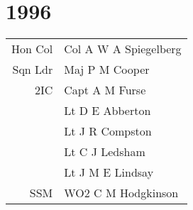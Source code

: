 \chapter*{1996}

\vspace*{5mm}

\begin{center}
  \small
  \begin{tabular}{rl}
    Hon Col & Col A W A Spiegelberg \\
    Sqn Ldr & Maj P M Cooper \\
    2IC & Capt A M Furse \\
    & Lt D E Abberton \\
    & Lt J R Compston \\
    & Lt C J Ledsham \\
    & Lt J M E Lindsay \\
    SSM & WO2 C M Hodgkinson \\
  \end{tabular}
\end{center}

